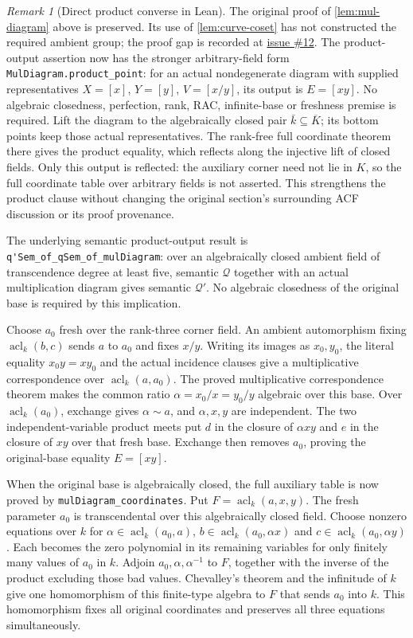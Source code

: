 \documentclass[11pt,oneside]{article}
\theoremstyle{definition}
\theoremstyle{remark}
\newtheorem{remark}[theorem]{Remark}
\newcommand{\acl}{\operatorname{acl}}
\newcommand{\Qrel}{\mathcal{Q}}
\newcommand{\Qprel}{\mathcal{Q}'}
\newcommand{\lean}[1]{\nolinkurl{#1}}
\begin{document}
\begin{remark}[Direct product converse in Lean]
The original proof of \cref{lem:mul-diagram} above is preserved.  Its use of
\cref{lem:curve-coset} has not constructed the required ambient group; the
proof gap is recorded at
\href{https://github.com/adamtopaz/acl_geom/issues/12\#issuecomment-6155280744}{issue \#12}.
The product-output assertion now has the stronger arbitrary-field form
\lean{MulDiagram.product_point}: for an actual nondegenerate diagram with supplied
representatives $X=[x]$, $Y=[y]$, $V=[x/y]$, its output is $E=[xy]$. No algebraic
closedness, perfection, rank, RAC, infinite-base or freshness premise is required.
Lift the diagram to the algebraically closed pair $\bar k\subseteq\overline K$;
its bottom points keep those actual representatives. The rank-free full coordinate
theorem there gives the product equality, which reflects along the injective lift of
closed fields. Only this output is reflected: the auxiliary corner need not lie in $K$,
so the full coordinate table over arbitrary fields is not asserted. This strengthens
the product clause without changing the original section's surrounding ACF discussion
or its proof provenance.

The underlying semantic product-output result is
\lean{q'Sem_of_qSem_of_mulDiagram}: over an algebraically closed ambient
field of transcendence degree at least five, semantic $\Qrel$ together with
an actual multiplication diagram gives semantic $\Qprel$.  No algebraic
closedness of the original base is required by this implication.

Choose $a_0$ fresh over the rank-three corner field.  An ambient automorphism
fixing $\acl_k(b,c)$ sends $a$ to $a_0$ and fixes $x/y$.  Writing its images
as $x_0,y_0$, the literal equality $x_0y=xy_0$ and the actual incidence
clauses give a multiplicative correspondence over $\acl_k(a,a_0)$.
The proved multiplicative correspondence theorem makes the common ratio
$\alpha=x_0/x=y_0/y$ algebraic over this base.  Over $\acl_k(a_0)$,
exchange gives $\alpha\sim a$, and $\alpha,x,y$ are independent.
The two independent-variable product meets put $d$ in the closure of
$\alpha xy$ and $e$ in the closure of $xy$ over that fresh base.
Exchange then removes $a_0$, proving the original-base equality $E=[xy]$.

When the original base is algebraically closed, the full auxiliary table is
now proved by \lean{mulDiagram_coordinates}.  Put $F=\acl_k(a,x,y)$.
The fresh parameter $a_0$ is transcendental over this algebraically closed
field.  Choose nonzero equations over $k$ for
$\alpha\in\acl_k(a_0,a)$, $b\in\acl_k(a_0,\alpha x)$ and
$c\in\acl_k(a_0,\alpha y)$.  Each becomes the zero polynomial in its
remaining variables for only finitely many values of $a_0$ in $k$.
Adjoin $a_0,\alpha,\alpha^{-1}$ to $F$, together with the inverse of the
product excluding those bad values.  Chevalley's theorem and the infinitude
of $k$ give one homomorphism of this finite-type algebra to $F$ that sends
$a_0$ into $k$.  This homomorphism fixes all original coordinates and
preserves all three equations simultaneously.


\end{remark}
\end{document}
